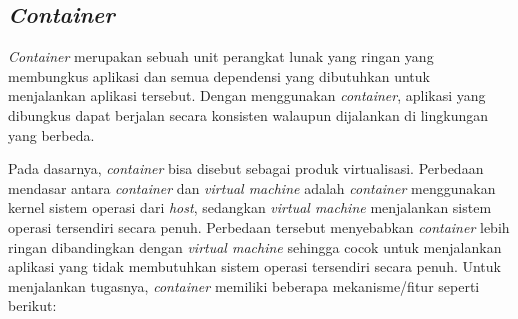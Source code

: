 \subsection{\emph{Container}}
\label{sec:container}

\emph{Container} merupakan sebuah unit perangkat lunak yang ringan yang membungkus
aplikasi dan semua dependensi yang dibutuhkan untuk menjalankan aplikasi tersebut. Dengan menggunakan
\emph{container}, aplikasi yang dibungkus dapat berjalan secara konsisten walaupun dijalankan
di lingkungan yang berbeda.

Pada dasarnya, \emph{container} bisa disebut sebagai produk virtualisasi. Perbedaan
mendasar antara \emph{container} dan \emph{virtual machine} adalah \emph{container}
menggunakan kernel sistem operasi dari \emph{host}, sedangkan \emph{virtual machine} menjalankan
sistem operasi tersendiri secara penuh. Perbedaan tersebut menyebabkan \emph{container} lebih ringan
dibandingkan dengan \emph{virtual machine} sehingga cocok untuk menjalankan aplikasi
yang tidak membutuhkan sistem operasi tersendiri secara penuh.
Untuk menjalankan tugasnya, \emph{container} memiliki beberapa mekanisme/fitur seperti
berikut:

